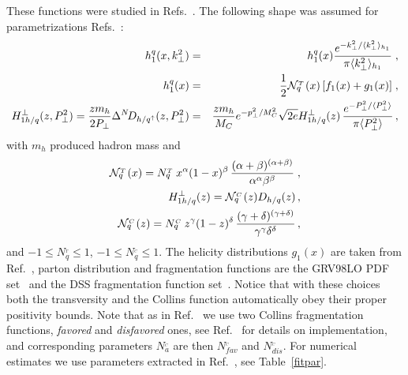 \documentclass[a4paper,11pt]{article}
\newcommand{\ba}{\begin{eqnarray}}
\newcommand{\ea}{\end{eqnarray}}
\newcommand{\la}{\langle}
\newcommand{\ra}{\rangle}
\def\T{_{_T}}
\def\C{_{_C}}
\def\kperp{k_\perp}
\def\pperp{P_\perp}
\def\avkperp{\la \kperp^2 \ra}
\def\avpperp{\la \pperp^2 \ra}
\begin{document}
These functions were studied in  
Refs.~\cite{Anselmino:2007fs,Anselmino:2008jk,Anselmino:2013vqa,
Kang:2014zza,Kang:2015msa,Anselmino:2015sxa}.
The following shape was assumed for parametrizations 
Refs.~\cite{Anselmino:2007fs,Anselmino:2008jk,Anselmino:2013vqa}:
 \ba
h_{1}^{q} (x, \kperp^2) &=&h_{1}^{q} (x)  \frac{e^{-{\kperp^2}/{\avkperp_{h_1} }}}{\pi \avkperp_{h_1}} \; ,\label{tr-funct}\\
h_{1}^{q} (x) &=&\frac{1}{2} {\cal N}^{\T}_q(x)\,
[f_{1}(x)+g_1(x)]\; ,\\
H_{1 h/q}^{\perp}(z, \pperp^2) = \frac{z m_h}{2 \pperp} \Delta^N \! D_{h/q^\uparrow}(z,\pperp^2) &=&  \frac{z m_h}{M_C} e^{-p_{\perp}^2/M_C^2} \sqrt{2 e} H_{1 h/q}^{\perp}(z) \,\frac{e^{-\pperp^2/{\avpperp}}}{\pi \avpperp}\,,
\label{coll-funct}
 \ea
 with $m_h$ produced hadron mass and
 \ba
 {\cal N}^{\T}_q(x)= N^{\T}_q
\,x^{\alpha} (1-x)^{\beta} \, \frac{(\alpha + \beta)^{(\alpha
+\beta)}} {\alpha^{\alpha} \beta^{\beta}}\; ,
\\
H_{1 h/q}^{\perp}(z) =  {\cal N}^{\C}_q(z) D_{h/q}(z)\, , \\
{\cal N}^{\C}_q(z)= N^{\C}_q \, z^{\gamma} (1-z)^{\delta} \,
\frac{(\gamma + \delta)^{(\gamma +\delta)}}
{\gamma^{\gamma} \delta^{\delta}}\, ,
 \ea
and $-1\le N^{\T}_q\le 1$, $-1 \le N^{\C}_q \le 1$. The helicity distributions $g_1(x)$ are taken
from Ref.~\cite{Gluck:2000dy}, parton distribution and fragmentation functions are the GRV98LO PDF set~\cite{Gluck:1998xa} and the
DSS fragmentation function set~\cite{deFlorian:2007aj}. Notice that with these choices both
the transversity and the Collins function automatically obey their
proper positivity bounds. Note that as in Ref.~\cite{Anselmino:2013vqa} we use two 
Collins fragmentation functions, {\it favored} and {\it disfavored} ones, see Ref.~\cite{Anselmino:2013vqa} for details on implementation, and corresponding parameters ${N}^{\C}_a$ are then  ${N}^{\C}_{fav}$ and ${N}^{\C}_{dis}$. For numerical estimates we use parameters extracted in Ref.~\cite{Anselmino:2013vqa}, see Table~\ref{fitpar}.
\end{document}
